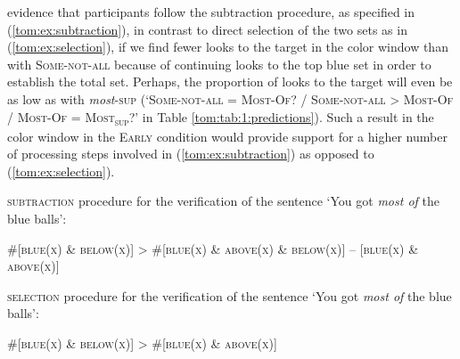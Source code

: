 \documentclass[output=paper]{langscibook}
\begin{document}
evidence that participants follow the subtraction procedure, as specified in (\ref{tom:ex:subtraction}), in contrast to direct selection of
the two sets as in (\ref{tom:ex:selection}), if we find fewer looks to the target in the color window than with \textsc{Some-not-all}
because of continuing looks to the top blue set in order to establish the total set. Perhaps, the proportion of looks
to the target will even be as low as with \textit{most}\textsc{-sup}\textit{ }(`\textsc{Some-not-all} = \textsc{Most-Of}? / \textsc{Some-not-all} {\textgreater} \textsc{Most-Of} / \textsc{Most-Of} = \textsc{Most\textsubscript{sup}}?' in Table \ref{tom:tab:1:predictions}). Such a result in the color window in the \textsc{Early} condition would provide
support for a higher number of processing steps involved in (\ref{tom:ex:subtraction}) as opposed to (\ref{tom:ex:selection}). 


\ea \textsc{subtraction} procedure for the verification of the sentence `You got \textit{most of }the blue balls': \ \ 

\#[\textsc{blue(x)} \& \textsc{below(x)}] {\textgreater} \#[\textsc{blue(x)} \& \textsc{above(x)} \& \textsc{below(x)}] – [\textsc{blue(x)} \& \textsc{above(x)}]\\
\label{tom:ex:subtraction}
\z


\ea \textsc{selection} procedure for the verification of the sentence `You got \textit{most of }the blue balls':

\#[\textsc{blue(x)} \& \textsc{below(x)}] {\textgreater} \#[\textsc{blue(x)} \& \textsc{above(x)}]
\label{tom:ex:selection}
\z

  
\end{document}
